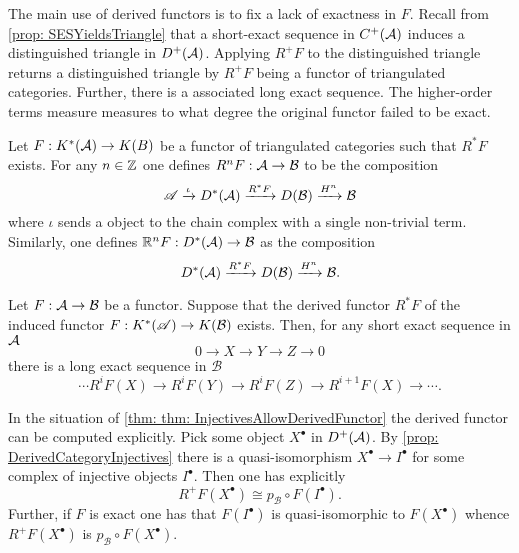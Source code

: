 The main use of derived functors is to fix a lack of exactness in $F$.
Recall from \cref{prop: SESYieldsTriangle} that a short-exact sequence in $C^+(\AA)$ induces a distinguished triangle in $D^+(\AA)$.
Applying $R^+F$ to the distinguished triangle returns a distinguished triangle by $R^+F$ being a functor of triangulated categories.
Further, there is a associated long exact sequence.
The higher-order terms measure measures to what degree the original functor failed to be exact.
\begin{definition}
 Let $F:K^*(\AA) \to K(B)$ be a functor of triangulated categories such that $R^*F$ exists.
 For any $n\in \Z$ one defines $R^nF:\AA \to \mathcal{B}$ to be the composition
 $$\A \xrightarrow{\iota} D^*(\AA) \xrightarrow{R^*F} D(\mathcal{B}) \xrightarrow{H^n} \mathcal{B} $$
 where $\iota$ sends a object to the chain complex with a single non-trivial term.
 Similarly, one defines $\mathbb{R}^nF:D^*(\AA)\to \mathcal{B}$ as the composition
 $$D^*(\AA) \xrightarrow{R^*F} D(\mathcal{B}) \xrightarrow{H^n} \mathcal{B}. $$
\end{definition}
\begin{proposition}
   Let $F:\AA\to \mathcal{B}$ be a functor.
   Suppose that the derived functor $R^*F$ of the induced functor $F:K^*(\A)\to K(\mathcal{B})$ exists.
   Then, for any short exact sequence in $\AA$
   $$0\to X \to Y \to Z \to 0 $$
   there is a long exact sequence in $\mathcal{B}$
   $$ \cdots R^{i}F(X)\to R^{i}F(Y) \to R^iF(Z) \to R^{i+1}F(X)\to \cdots. $$
\end{proposition}
In the situation of \cref{thm: thm: InjectivesAllowDerivedFunctor} the derived functor can be computed explicitly.
Pick some object $X^\bullet$ in $D^+(\AA)$.
By \cref{prop: DerivedCategoryInjectives} there is a quasi-isomorphism $X^\bullet\to I^\bullet$ for some complex of injective objects $I^\bullet$.
Then one has explicitly
$$R^+F(X^\bullet) \cong p_\mathcal{B} \circ F(I^\bullet). $$
Further, if $F$ is exact one has that $F(I^\bullet)$ is quasi-isomorphic to $F(X^\bullet)$ whence $R^+F(X^\bullet)$ is $p_\mathcal{B}\circ F(X^\bullet)$.

